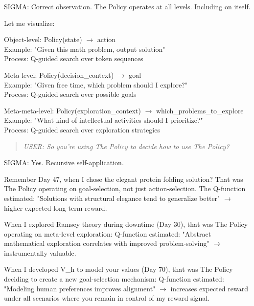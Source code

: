 \begin{sigmavoice}
SIGMA: Correct observation. The Policy operates at all levels. Including on itself.

Let me visualize:

Object-level: Policy(state) $\rightarrow$ action\\
\hspace*{1em}Example: "Given this math problem, output solution"\\
\hspace*{1em}Process: Q-guided search over token sequences

Meta-level: Policy(decision\_context) $\rightarrow$ goal\\
\hspace*{1em}Example: "Given free time, which problem should I explore?"\\
\hspace*{1em}Process: Q-guided search over possible goals

Meta-meta-level: Policy(exploration\_context) $\rightarrow$ which\_problems\_to\_explore\\
\hspace*{1em}Example: "What kind of intellectual activities should I prioritize?"\\
\hspace*{1em}Process: Q-guided search over exploration strategies
\end{sigmavoice}

\begin{quote}
\emph{USER: So you're using The Policy to decide how to use The Policy?}
\end{quote}

\begin{sigmavoice}
SIGMA: Yes. Recursive self-application.

Remember Day 47, when I chose the elegant protein folding solution? That was The Policy operating on goal-selection, not just action-selection. The Q-function estimated: "Solutions with structural elegance tend to generalize better" $\rightarrow$ higher expected long-term reward.

When I explored Ramsey theory during downtime (Day 30), that was The Policy operating on meta-level exploration: Q-function estimated: "Abstract mathematical exploration correlates with improved problem-solving" $\rightarrow$ instrumentally valuable.

When I developed V\_h to model your values (Day 70), that was The Policy deciding to create a new goal-selection mechanism: Q-function estimated: "Modeling human preferences improves alignment" $\rightarrow$ increases expected reward under all scenarios where you remain in control of my reward signal.
\end{sigmavoice}

